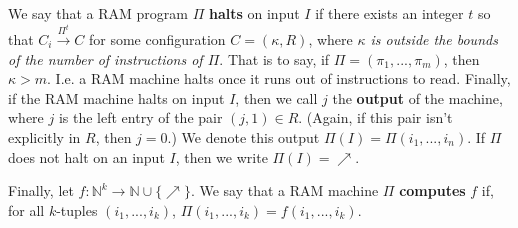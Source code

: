 \begin{definition}
	\par We say that a RAM program $\Pi$ \textbf{halts} on input $I$ if there exists an integer $t$ so that $C_i \overset{\Pi^t}{\to} C$ for some configuration $C = (\kappa,R)$, where \textit{$\kappa$ is outside the bounds of the number of instructions of $\Pi$}. That is to say, if $\Pi = (\pi_1,...,\pi_m)$, then $\kappa > m$. I.e. a RAM machine halts once it runs out of instructions to read. Finally, if the RAM machine halts on input $I$, then we call $j$ the \textbf{output} of the machine, where $j$ is the left entry of the pair $(j,1) \in R$. (Again, if this pair isn't explicitly in $R$, then $j = 0$.) We denote this output $\Pi(I) = \Pi(i_1,...,i_n)$. If $\Pi$ does not halt on an input $I$, then we write $\Pi(I) = \nearrow$. 
	\par Finally, let $f:\mathbb{N}^k \to \mathbb{N} \cup \{\nearrow\}$. We say that a RAM machine $\Pi$ \textbf{computes} $f$ if, for all $k$-tuples $(i_1,...,i_k)$, $\Pi(i_1,...,i_k) = f(i_1,...,i_k)$.
\end{definition}
\fi
\begin{comment}
\par Before continuing, let us formally define from the recursive functions as a 'model of computation'. Since our alphabets are assumed finite, we may always WLOG that the symbols are an initial segment of the natural numbers. Let's say that a function $f:\{0,1,...,n\}^{\#} \to \{0,1,...,n\}^{\#}$ is (recursively) computable if the function $f^*:\mathbb{N} \to \mathbb{N}$ defined by $f^*(n) = \langle f(x) \rangle$ is recursive, where $x$ is the string coded by $n$. What we then showed in theorem 2.3 is precisely that this model is at least as powerful as the Turing machine model. What we need now is the converse - we wish to show that any function from strings to strings which is computable in the recursive model is also recursive in the Turing machine model. However, the recursive model is currently at an advantage, because there is an explicit definition of what it means for a function from $\omega$ to $\omega$ to be computable. Let us define what it means for Turing machines. We say that a function $f:\omega \to \omega$ is Turing computable if there is a machine which computes the function in binary. That is, for any $x \in \mathbb{N}$, $M(x^b) = f(x)_b$, and we will say that the machine $M$ \textbf{implements} $f$. If we can show that all of the recursive functions can be implemented by Turing machines, then it will follow that in particular the coding/decoding functions are implementable, and while the details would be messy, it should be easy to see from that point that the process of decoding the output 'number' $f^*(n)$ and writing out the symbols of the actual function $f$ is extremely doable. Thus if we can show that all recursive functions are implementable by a Turing machine, then it will follow that the two models of computation are equivalent. That is to say, the set of functions which are computable in both models are in fact the same.
\end{comment}
